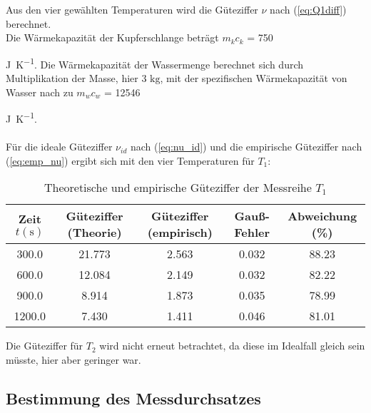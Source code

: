 
Aus den vier gewählten Temperaturen wird die Güteziffer $\nu$ nach (\ref{eq:Q1diff}) berechnet.
\\
Die Wärmekapazität der Kupferschlange beträgt $m_{k} c_{k}$ = 750 {\unit[per-mode=fraction]{\joule\per\kelvin}. 
Die Wärmekapazität der Wassermenge berechnet sich durch Multiplikation der Masse, hier 3 $\unit{\kilo\gram}$, mit der spezifischen
Wärmekapazität von Wasser nach \cite[278]{demtroeder1} zu $m_{w} c_{w}$ = 12546 {\unit[per-mode=fraction]{\joule\per\kelvin}. \\
\\
Für die ideale Güteziffer $\nu_{id}$ nach (\ref{eq:nu_id}) und die empirische Güteziffer nach (\ref{eq:emp_nu})
ergibt sich mit den vier Temperaturen für $T_{1}$:

\begin{table}
  \centering
  \caption{Theoretische und empirische Güteziffer der Messreihe $T_{1}$}
  \label{tab:güteziffern_t1}
  \begin{tabular}{c c c c c}
    \toprule
    {Zeit $t (\unit{\second})$} &
    Güteziffer (Theorie) &
    Güteziffer (empirisch) &
    Gauß-Fehler &
    Abweichung (\%) \\
    \midrule
     300.0 &                21.773 &                   2.563 &        0.032 &           88.23 \\
     600.0 &                12.084 &                   2.149 &        0.032 &           82.22 \\
     900.0 &                 8.914 &                   1.873 &        0.035 &           78.99 \\
    1200.0 &                 7.430 &                   1.411 &        0.046 &           81.01 \\
    \bottomrule
    \end{tabular}
\end{table}

Die Güteziffer für $T_{2}$ wird nicht erneut betrachtet, da diese im Idealfall gleich sein
müsste, hier aber geringer war. \\

\subsection{Bestimmung des Messdurchsatzes}

}}
